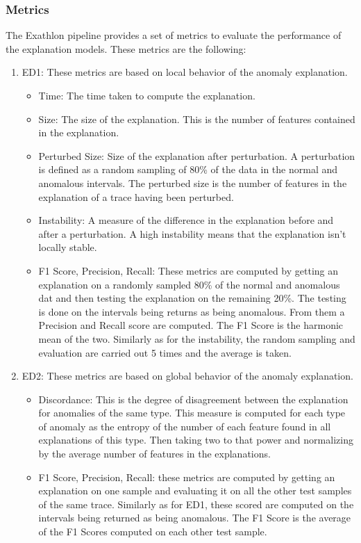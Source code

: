 \documentclass[oneside, a4paper, onecolumn, 11pt]{article}
\begin{document}
\subsubsection{Metrics}
The Exathlon pipeline provides a set of metrics to evaluate the performance of the explanation models. These metrics are the following:
\begin{enumerate}
  \item ED1: These metrics are based on local behavior of the anomaly explanation.
  \begin{itemize}
    \item Time: The time taken to compute the explanation.
    \item Size: The size of the explanation. This is the number of features contained in the explanation.
    \item Perturbed Size: Size of the explanation after perturbation. A perturbation is defined as a random sampling of 80\% of the data in the normal and anomalous intervals. The perturbed size is the number of features in the explanation of a trace having been perturbed.
    \item Instability: A measure of the difference in the explanation before and after a perturbation. A high instability means that the explanation isn't locally stable.
    \item F1 Score, Precision, Recall: These metrics are computed by getting an explanation on a randomly sampled 80\% of the normal and anomalous dat and then testing the explanation on the remaining 20\%. The testing is done on the intervals being returns as being anomalous. From them a Precision and Recall score are computed. The F1 Score is the harmonic mean of the two. Similarly as for the instability, the random sampling and evaluation are carried out 5 times and the average is taken.
  \end{itemize}
  \item ED2: These metrics are based on global behavior of the anomaly explanation.
  \begin{itemize}
    \item Discordance: This is the degree of disagreement between the explanation for anomalies of the same type. This measure is computed for each type of anomaly as the entropy of the number of each feature found in all explanations of this type. Then taking two to that power and normalizing by the average number of features in the explanations.
    \item F1 Score, Precision, Recall: these metrics are computed by getting an explanation on one sample and evaluating it on all the other test samples of the same trace. Similarly as for ED1, these scored are computed on the intervals being returned as being anomalous. The F1 Score is the average of the F1 Scores computed on each other test sample.
  \end{itemize}

\end{enumerate}
\end{document}
